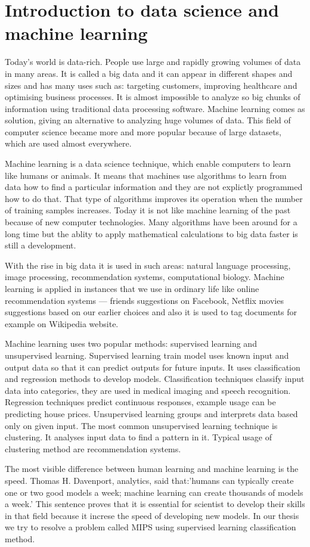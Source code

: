\section{Introduction to data science and machine learning}

Today’s world is data-rich. 
People use large and rapidly growing volumes of data in many areas. 
It is called a big data and it can appear in different shapes and sizes and has many uses such as: targeting customers, improving healthcare and optimising business processes. 
It is almost impossible to analyze so big chunks of information using traditional data processing software.
Machine learning comes as solution, giving an alternative to analyzing huge volumes of data.
This field of computer science became more and more popular because of large datasets, which are used almost everywhere.

Machine learning is a data science technique, which enable computers to learn like humans or animals. It means that machines use algorithms to learn from data how to find a particular information and they are not explictly programmed how to do that.
That type of algorithms improves its operation when the number of training samples increases.
Today it is not like machine learning of the past because of new computer technologies.
Many algorithms have been around for a long time but the ablity to apply mathematical calculations to big data faster is still a development.

With the rise in big data it is used in such areas: natural language processing, image processing, recommendation systems, computational biology. Machine learning is applied in instances that we use in ordinary life like online recommendation systems --- friends suggestions on Facebook, Netflix movies suggestions based on our earlier choices and also it is used to tag documents for example on Wikipedia website.

Machine learning uses two popular methods: supervised learning and unsupervised learning.
Supervised learning train model uses known input and output data so that it can predict outputs for future inputs.
It uses classification and regression methods to develop models.
Classification techniques classify input data into categories, they are used in medical imaging and speech recognition.
Regression techniques predict continuous responses, example usage can be predicting house prices. Unsupervised learning groups and interprets data based only on given input.
The most common unsupervised learning technique is clustering.
It analyses input data to find a pattern in it. Typical usage of clustering method are recommendation systems. 

The most visible difference between human learning and machine learning is the speed. 
Thomas H. Davenport, analytics, said that:'humans can typically create one or two good models a week; machine learning can create thousands of models a week.'\cite{machine_learning} 
This sentence proves that it is essential for scientist to develop their skills in that field because it increse the speed of developing new models.
In our thesis we try to resolve a problem called MIPS using supervised learning classification method.

